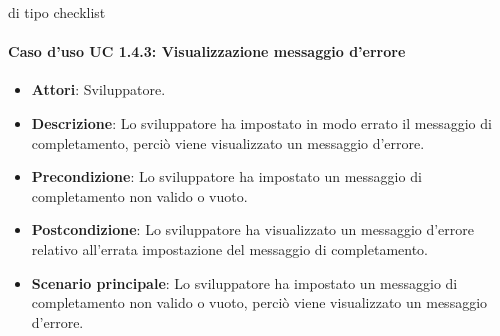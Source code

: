 di tipo checklist\paragraph{Caso d'uso UC 1.4.3: Visualizzazione messaggio d'errore}

\FloatBarrier
\begin{itemize}
\item\textbf{Attori}: Sviluppatore.
\item\textbf{Descrizione}: Lo sviluppatore ha impostato in modo errato il messaggio di completamento, perciò viene visualizzato un messaggio d'errore.
\item\textbf{Precondizione}: Lo sviluppatore ha impostato un messaggio di completamento non valido o vuoto.
\item\textbf{Postcondizione}: Lo sviluppatore ha visualizzato un messaggio d'errore relativo all'errata impostazione del messaggio di completamento.
\item\textbf{Scenario principale}: Lo sviluppatore ha impostato un messaggio di completamento non valido o vuoto, perciò viene visualizzato un messaggio d'errore.
\end{itemize}
